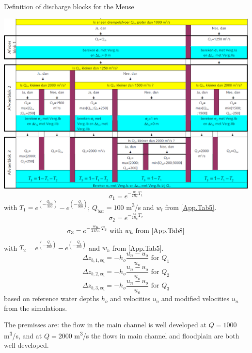 \begin{table}
\caption{Definition of discharge blocks for the Meuse}
\label{App.Tab8}
\includegraphics[width=\columnwidth]{figures/Tab8.png}
%
\begin{equation}
\sigma_1 = e^{-\frac{w_l}{2 B_n} T_1}
\end{equation}
with $T_1 = e^{\left ( - \frac{Q_\text{bar}}{300} \right )} - e^{\left ( - \frac{Q_1}{300} \right )}$; $Q_\text{bar} = 100$ m\textsuperscript{3}/s and $w_l$ from \autoref{App.Tab5}.
%
\begin{equation}
\sigma_2 = e^{-\frac{w_h}{2 B_n} T_2}
\end{equation}
%
\begin{equation}
\sigma_3 = e^{-\frac{w_h}{2 B_n} T_3} \text{ with $w_h$ from \autoref{App.Tab8}}
\end{equation}
 with $T_2 = e^{\left ( - \frac{Q_1}{300} \right )} - e^{\left ( - \frac{Q_2}{300} \right )}$ and $w_h$ from \autoref{App.Tab5}.
%
\begin{equation}
\Delta z_{b,1,\text{eq}} = -h_o \frac{u_n - u_o}{u_o} \text{  for $Q_1$}
\end{equation}
%
\begin{equation}
\Delta z_{b,2,\text{eq}} = -h_o \frac{u_n - u_o}{u_o} \text{  for $Q_2$}
\end{equation}
%
\begin{equation}
\Delta z_{b,3,\text{eq}} = -h_o \frac{u_n - u_o}{u_o} \text{  for $Q_3$}
\end{equation}
based on reference water depths $h_o$ and velocities $u_o$ and modified velocities $u_n$ from the simulations.

The premisses are: the flow in the main channel is well developed at $Q = 1000$ m\textsuperscript{3}/s, and at $Q = 2000$ m\textsuperscript{3}/s the flows in main channel and floodplain are both well developed.
\end{table}


